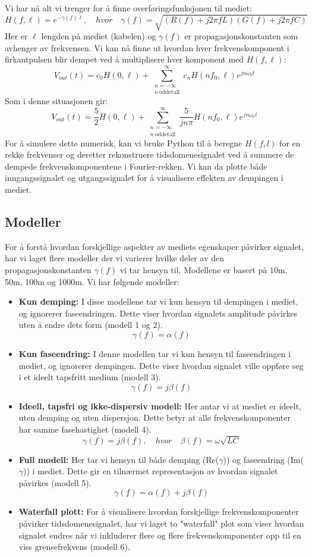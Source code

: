 \noindent Vi har nå alt vi trenger for å finne overføringsfunksjonen til mediet:
\[
    H(f, \ell) = e^{-\gamma(f) \ell}, \quad hvor \quad \gamma(f) = \sqrt{(R(f) + j 2\pi f L)(G(f) + j 2\pi f C)}
\]
Her er $\ell$ lengden på mediet (kabelen) og $\gamma(f)$ er propagasjonskonstanten som avhenger av frekvensen.
Vi kan nå finne ut hvordan hver frekvenskomponent i firkantpulsen blir dempet ved å multiplisere hver komponent med $H(f, \ell)$:
\[
    V_{out}(t) = c_0H(0, \ell) + \sum_{\substack{n=-\infty\\ n\ \text{oddetall}}}^{\infty} c_n H(n f_0, \ell) e^{j n \omega_0 t}
\]
Som i denne situasjonen gir:
\[
    V_{out}(t) = \frac{5}{2}H(0, \ell) + \sum_{\substack{n=-\infty\\ n\ \text{oddetall}}}^{\infty} \frac{5}{j n \pi} H(n f_0, \ell) e^{j n \omega_0 t}    
\]
For å simulere dette numerisk, kan vi bruke Python til å beregne $H(f, l)$ for en rekke frekvenser og deretter rekonstruere tidsdomenesignalet ved å summere de dempede frekvenskomponentene i Fourier-rekken.
Vi kan da plotte både inngangssignalet og utgangssignalet for å visualisere effekten av dempingen i mediet.
\clearpage
\subsection{Modeller}
For å forstå hvordan forskjellige aspekter av mediets egenskaper påvirker signalet, har vi laget flere modeller der vi varierer hvilke deler av den propagasjonskonstanten $\gamma(f)$ vi tar hensyn til. Modellene er basert på 10m, 50m, 100m og 1000m. Vi har følgende modeller:\\
\begin{itemize}
    \item \textbf{Kun demping:} I disse modellene tar vi kun hensyn til dempingen i mediet, og ignorerer faseendringen. Dette viser hvordan signalets amplitude påvirkes uten å endre dets form (modell 1 og 2).
    \[
        \gamma(f) = \alpha(f)
    \]
    \item \textbf{Kun faseendring:} I denne modellen tar vi kun hensyn til faseendringen i mediet, og ignorerer dempingen. Dette viser hvordan signalet ville oppføre seg i et ideelt tapsfritt medium (modell 3).
    \[
        \gamma(f) = j\beta(f)
    \]
    \item \textbf{Ideell, tapsfri og ikke-dispersiv modell:} Her antar vi at mediet er ideelt, uten demping og uten dispersjon. Dette betyr at alle frekvenskomponenter har samme fasehastighet (modell 4).
    \[
        \gamma(f) = j\beta(f), \quad hvor \quad \beta(f) = \omega\sqrt{LC}
    \]
    \item \textbf{Full modell:} Her tar vi hensyn til både demping (Re($\gamma$)) og faseendring (Im($\gamma$)) i mediet. Dette gir en tilnærmet representasjon av hvordan signalet påvirkes (modell 5).
    \[
        \gamma(f) = \alpha(f) + j\beta(f)
    \]
    \item \textbf{Waterfall plott:} For å visualisere hvordan forskjellige frekvenskomponenter påvirker tidsdomenesignalet, har vi laget to "waterfall" plot som viser hvordan signalet endres når vi inkluderer flere og flere frekvenskomponenter opp til en viss grensefrekvens (modell 6).
\end{itemize}
\clearpage
